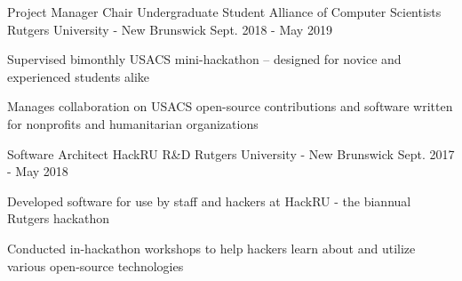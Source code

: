 


\begin{cventries}
  \cventry
  {Project Manager Chair} %
  {Undergraduate Student Alliance of Computer Scientists} %
  {Rutgers University - New Brunswick} %
  {Sept. 2018 - May 2019} %
  { %
    \begin{cvitems}
    \item {Supervised bimonthly USACS mini-hackathon -- designed for novice and experienced students alike}
    \item {Manages collaboration on USACS open-source contributions and software written for nonprofits and humanitarian organizations}
    \end{cvitems}
  }

  \cventry
  {Software Architect} %
  {HackRU R\&D} %
  {Rutgers University - New Brunswick} %
  {Sept. 2017 - May 2018} %
  { %
    \begin{cvitems}
    \item {Developed software for use by staff and hackers at HackRU - the biannual Rutgers hackathon}
    \item {Conducted in-hackathon workshops to help hackers learn about and utilize various open-source technologies}
    \end{cvitems}
  }
\end{cventries}

